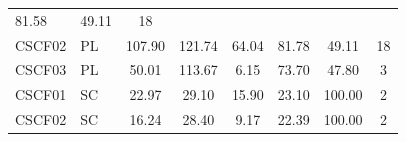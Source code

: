 \documentclass[11pt,a4paper]{article}
\begin{document}
\begin{table}[H]
\begin{tabular}{llcccccc}
    
        81.58
     &

    
        49.11
     &

    
        18
    
    \\

    CSCF02 &
    PL &

    
        107.90
     &

    
        121.74
     &

    
        64.04
     &

    
        81.78
     &

    
        49.11
     &

    
        18
    
    \\

    CSCF03 &
    PL &

    
        50.01
     &

    
        113.67
     &

    
        6.15
     &

    
        73.70
     &

    
        47.80
     &

    
        3
    
    \\

    CSCF01 &
    SC &

    
        22.97
     &

    
        29.10
     &

    
        15.90
     &

    
        23.10
     &

    
        100.00
     &

    
        2
    
    \\

    CSCF02 &
    SC &

    
        16.24
     &

    
        28.40
     &

    
        9.17
     &

    
        22.39
     &

    
        100.00
     &

    
        2
    

\end{tabular}
\end{table}
\end{document}
